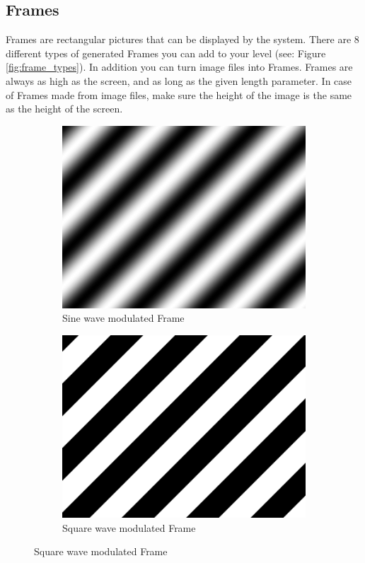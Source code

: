 \documentclass[11pt,a4paper]{article}
\begin{document}
\subsection{Frames}
Frames are rectangular pictures that can be displayed by the system. There are 8 different types of generated Frames you can add to your level (see: Figure \ref{fig:frame_types}). In addition you can turn image files into Frames. Frames are always as high as the screen, and as long as the given length parameter. In case of Frames made from image files, make sure the height of the image is the same as the height of the screen.

\begin{figure}
\centering
	\begin{subfigure}[t]{0.35\textwidth}
	\includegraphics[width=1\textwidth]{sine.png}
	\caption{Sine wave modulated Frame}
	\label{fig:sine_frame}
	\end{subfigure}
	\hspace{1em}
	\begin{subfigure}[t]{0.35\textwidth}
	\includegraphics[width=1\textwidth]{square.png}
	\caption{Square wave modulated Frame}
	\label{fig:square_frame}
	\end{subfigure}


\end{figure}
\end{document}
